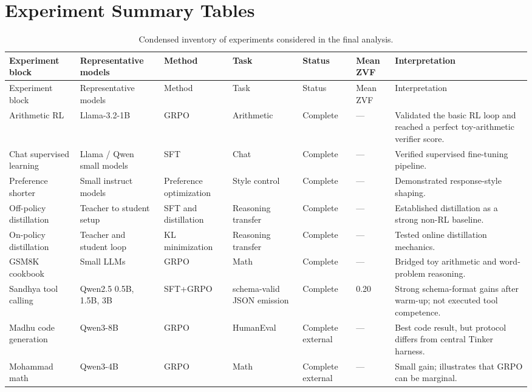 \documentclass[12pt,a4paper]{report}
\begin{document}
\appendix
\chapter{Experiment Summary Tables}
\label{app:experiment-summary}

\begin{landscape}
\begingroup
\footnotesize
\setlength{\tabcolsep}{3pt}
\begin{longtable}{p{3.2cm}p{3.0cm}p{2.5cm}p{2.2cm}p{1.8cm}p{1.5cm}p{4.8cm}}
\caption{Condensed inventory of experiments considered in the final analysis.}\label{tab:condensed-inventory}\\
\toprule
Experiment block & Representative models & Method & Task & Status & Mean ZVF & Interpretation\\
\midrule
\endfirsthead
\toprule
Experiment block & Representative models & Method & Task & Status & Mean ZVF & Interpretation\\
\midrule
\endhead
Arithmetic RL & Llama-3.2-1B & GRPO & Arithmetic & Complete & --- & Validated the basic RL loop and reached a perfect toy-arithmetic verifier score.\\
Chat supervised learning & Llama / Qwen small models & SFT & Chat & Complete & --- & Verified supervised fine-tuning pipeline.\\
Preference shorter & Small instruct models & Preference optimization & Style control & Complete & --- & Demonstrated response-style shaping.\\
Off-policy distillation & Teacher to student setup & SFT and distillation & Reasoning transfer & Complete & --- & Established distillation as a strong non-RL baseline.\\
On-policy distillation & Teacher and student loop & KL minimization & Reasoning transfer & Complete & --- & Tested online distillation mechanics.\\
GSM8K cookbook & Small LLMs & GRPO & Math & Complete & --- & Bridged toy arithmetic and word-problem reasoning.\\
Sandhya tool calling & Qwen2.5 0.5B, 1.5B, 3B & SFT+GRPO & schema-valid JSON emission & Complete & 0.20 & Strong schema-format gains after warm-up; not executed tool competence.\\
Madhu code generation & Qwen3-8B & GRPO & HumanEval & Complete external & --- & Best code result, but protocol differs from central Tinker harness.\\
Mohammad math & Qwen3-4B & GRPO & Math & Complete external & --- & Small gain; illustrates that GRPO can be marginal.\\

\end{longtable}
\end{landscape}
\end{document}
